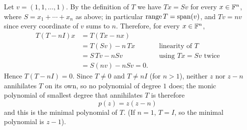 \begin{xrcs}
\begin{xsol}
    Let $v = (1, 1, \dots, 1)$. By the definition of $T$ we have $Tx = S v$ for every $x \in \mathbb{F}^n$, where $S = x_1 + \cdots + x_n$ as above; in particular $\operatorname{range} T = \operatorname{span} (v)$, and $Tv = nv$ since every coordinate of $v$ sums to $n$. Therefore, for every $x \in \mathbb{F}^n$,
    \begin{equation}
      \begin{aligned}
        T(T - nI)x &= T(Tx - nx) \\
                   &= T(Sv) - n\,Tx
                   &&\text{linearity of } T \\
                   &= S\,Tv - n S v
                   &&\text{using } Tx = Sv \text{ twice} \\
                   &= S (nv) - n S v = 0.
      \end{aligned}
    \end{equation}
    Hence $T(T - nI) = 0$. Since $T \neq 0$ and $T \neq nI$ (for $n > 1$), neither $z$ nor $z-n$ annihilates $T$ on its own, so no polynomial of degree $1$ does; the monic polynomial of smallest degree that annihilates $T$ is therefore
    \begin{equation}
      p(z) = z(z - n)
    \end{equation}
    and this is the minimal polynomial of $T$. (If $n = 1$, $T = I$, so the minimal polynomial is $z - 1$).
  \end{xsol}
\end{xrcs}

